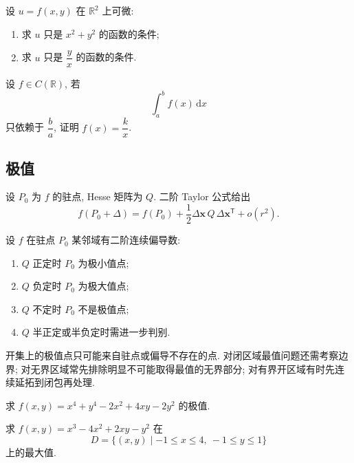 \documentclass[../../数学分析培优讲义.tex]{subfiles}
\begin{document}
\begin{example}
设 $u=f(x,y)$ 在 $\mathbb{R}^2$ 上可微:
\begin{enumerate}[label=(\arabic*)]
    \item 求 $u$ 只是 $x^2+y^2$ 的函数的条件;
    \item 求 $u$ 只是 $\dfrac{y}{x}$ 的函数的条件.
\end{enumerate}
\end{example}
\exampleblank

\begin{example}
设 $f\in C(\mathbb{R})$, 若
\[
    \int_a^bf(x)\,\mathrm{d}x
\]
只依赖于 $\dfrac{b}{a}$, 证明 $f(x)=\dfrac{k}{x}$.
\end{example}
\exampleblank



\subsection{极值}



设 $P_0$ 为 $f$ 的驻点, Hesse 矩阵为 $Q$. 二阶 Taylor 公式给出
\[
    f(P_0+\Delta)=f(P_0)+\dfrac{1}{2}\Delta\bm x\,Q\,\Delta\bm x^{\mathsf T}+o(r^2).
\]

\begin{theorem}[\markstar]
设 $f$ 在驻点 $P_0$ 某邻域有二阶连续偏导数:
\begin{enumerate}[label=(\arabic*)]
    \item $Q$ 正定时 $P_0$ 为极小值点;
    \item $Q$ 负定时 $P_0$ 为极大值点;
    \item $Q$ 不定时 $P_0$ 不是极值点;
    \item $Q$ 半正定或半负定时需进一步判别.
\end{enumerate}
\end{theorem}

\begin{remark}
开集上的极值点只可能来自驻点或偏导不存在的点. 对闭区域最值问题还需考察边界; 对无界区域常先排除明显不可能取得最值的无界部分; 对有界开区域有时先连续延拓到闭包再处理.
\end{remark}

\begin{example}
求 $f(x,y)=x^4+y^4-2x^2+4xy-2y^2$ 的极值.
\end{example}
\exampleblank

\begin{example}
求 $f(x,y)=x^3-4x^2+2xy-y^2$ 在
\[
    D=\{(x,y)\mid -1\leq x\leq4,\ -1\leq y\leq1\}
\]
上的最大值.
\end{example}
\exampleblank
\end{document}
